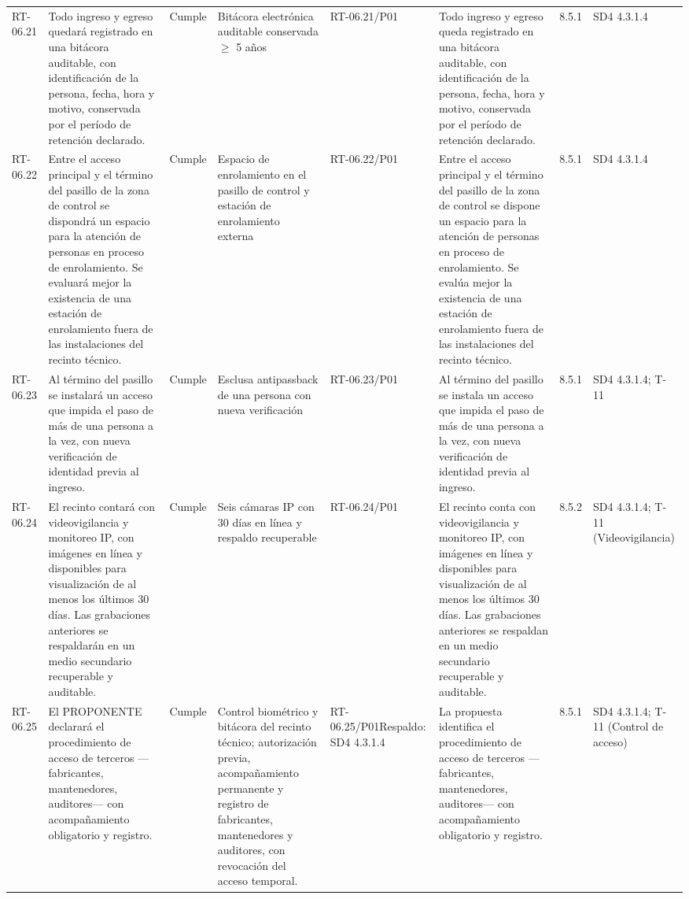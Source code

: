 \documentclass[oficio,firma,final]{lafrox}
\begin{document}
\begin{landscape}
{\begin{longtable}{@{}F{0.054} F{0.173} F{0.061} F{0.191} F{0.106} F{0.180} F{0.067} F{0.168}@{}}
  RT-06.21 & Todo ingreso y egreso quedará registrado en una bitácora auditable, con identificación de la persona, fecha, hora y motivo, conservada por el período de retención declarado. & Cumple & Bitácora electrónica auditable conservada $\geq$ 5 años & RT-06.21/\allowbreak{}P01 & Todo ingreso y egreso queda registrado en una bitácora auditable, con identificación de la persona, fecha, hora y motivo, conservada por el período de retención declarado. & 8.5.1 & SD4 4.3.1.4  \\
  RT-06.22 & Entre el acceso principal y el término del pasillo de la zona de control se dispondrá un espacio para la atención de personas en proceso de enrolamiento. Se evaluará mejor la existencia de una estación de enrolamiento fuera de las instalaciones del recinto técnico. & Cumple & Espacio de enrolamiento en el pasillo de control y estación de enrolamiento externa & RT-06.22/\allowbreak{}P01 & Entre el acceso principal y el término del pasillo de la zona de control se dispone un espacio para la atención de personas en proceso de enrolamiento. Se evalúa mejor la existencia de una estación de enrolamiento fuera de las instalaciones del recinto técnico. & 8.5.1 & SD4 4.3.1.4  \\
  RT-06.23 & Al término del pasillo se instalará un acceso que impida el paso de más de una persona a la vez, con nueva verificación de identidad previa al ingreso. & Cumple & Esclusa antipassback de una persona con nueva verificación & RT-06.23/\allowbreak{}P01 & Al término del pasillo se instala un acceso que impida el paso de más de una persona a la vez, con nueva verificación de identidad previa al ingreso. & 8.5.1 & SD4 4.3.1.4; T-11  \\
  RT-06.24 & El recinto contará con videovigilancia y monitoreo IP, con imágenes en línea y disponibles para visualización de al menos los últimos 30 días. Las grabaciones anteriores se respaldarán en un medio secundario recuperable y auditable. & Cumple & Seis cámaras IP con 30 días en línea y respaldo recuperable & RT-06.24/\allowbreak{}P01 & El recinto conta con videovigilancia y monitoreo IP, con imágenes en línea y disponibles para visualización de al menos los últimos 30 días. Las grabaciones anteriores se respaldan en un medio secundario recuperable y auditable. & 8.5.2 & SD4 4.3.1.4; T-11 (Videovigilancia)  \\
  RT-06.25 & El PROPONENTE declarará el procedimiento de acceso de terceros —fabricantes, mantenedores, auditores— con acompañamiento obligatorio y registro. & Cumple & Control biométrico y bitácora del recinto técnico; autorización previa, acompañamiento permanente y registro de fabricantes, mantenedores y auditores, con revocación del acceso temporal. & RT-06.25/\allowbreak{}P01\newline Respaldo: SD4 4.3.1.4 & La propuesta identifica el procedimiento de acceso de terceros —fabricantes, mantenedores, auditores— con acompañamiento obligatorio y registro. & 8.5.1 & SD4 4.3.1.4; T-11 (Control de acceso)  \\

\end{longtable}}
\end{landscape}
\end{document}
